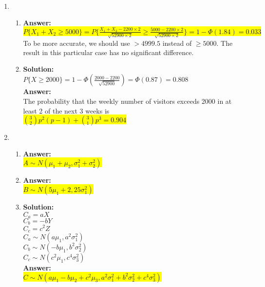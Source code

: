 \documentclass{article}
\newcommand{\myansw}{\textbf{Answer:}\\}
\newcommand{\mysolu}{\textbf{Solution:}\\}
\begin{document}
\begin{enumerate}
\begin{enumerate}
	\end{enumerate}
	\item 
	\begin{enumerate}
		\item
		\myansw
		\colorbox{yellow}{${P\{X_1 + X_2 \geq 5000\} = P\{\frac{X_1+X_2 - 2200 \times 2}{\sqrt{52900 \times 2}} \geq \frac{5000 - 2200 \times 2}{\sqrt{52900 \times 2}} \}
		=1-\Phi (1.84) = 0.033}$}\\
		To be more accurate, we should use ${> 4999.5}$ instead of ${\geq 5000}$. The result in this particular case has no significant difference.
		\item
		\mysolu
		${P\{X \geq 2000  \} = 1 - \Phi(\frac{2000 - 2200}{\sqrt{52900}})=  \Phi(0.87) = 0.808}$\\
		\myansw
		The probability that the weekly number of visitors exceeds 2000 in at least 2 of the next 3 weeks is\\
		\colorbox{yellow}{${{3 \choose 2}p^2(p-1)+{3 \choose 1}p^3}=0.904$}\\
	\end{enumerate}
	\item
	\begin{enumerate}
		\item
		\myansw
		\colorbox{yellow}{${A \sim N(\mu_1+\mu_2, \sigma_1^2+\sigma_2^2)}$}\\
		\item
		\myansw
		\colorbox{yellow}{${B \sim N(5\mu_1+2, 25\sigma_1^2)}$}\\
		\item 
		\mysolu
		${C_a = aX}$\\
		${C_b = -bY}$\\
		${C_c = c^2Z}$\\
		${C_a \sim N(a\mu_1, a^2\sigma_1^2)}$\\
		${C_b \sim N(-b\mu_1, b^2\sigma_2^2)}$\\
		${C_c \sim N(c^2\mu_1, c^4\sigma_3^2)}$\\
		\myansw
		\colorbox{yellow}{${C \sim N(a\mu_1 - b\mu_2 + c^2\mu_3, a^2\sigma_1^2+b^2\sigma_2^2+c^4\sigma_3^2)}$}\\
		

\end{enumerate}
\end{enumerate}
\end{document}
